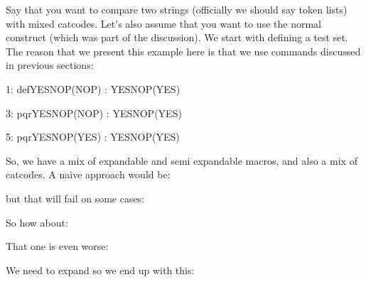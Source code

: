 {Say that you want to compare two strings (officially we should say token lists)
with mixed catcodes. Let's also assume that you want to use the normal \type
{\if} construct (which was part of the discussion). We start with defining
a test set. The reason that we present this example here is that we use
commands discussed in previous sections:

\startbuffer[run]
\semiprotected {}
              \edef\pqr{\expandtoken\notcatcodes`p%
                        \expandtoken\notcatcodes`q%
                        \expandtoken\notcatcodes`r}

1: \ifcondition{} {def}YES\else NOP\fi (NOP) : \ifcondition{}YES\else NOP\fi (YES)

3: \ifcondition{} {pqr}YES\else NOP\fi (NOP) : \ifcondition{}YES\else NOP\fi (YES)

5: \ifcondition{} {pqr}YES\else NOP\fi (YES) : \ifcondition\similartokens{pqr}{\pqr}YES\else NOP\fi (YES)
\stopbuffer

\typebuffer[run][option=TEX]

So, we have a mix of expandable and semi expandable macros, and also a mix of
catcodes. A naive approach would be:

\startbuffer[def]
\permanent\protected{}
\stopbuffer

\typebuffer[def][option=TEX]

but that will fail on some cases:

\pushoverloadmode \startpacked \tttf {}\stoppacked \popoverloadmode

So how about:

\startbuffer[def]
\permanent\protected{}
\stopbuffer

\typebuffer[def][option=TEX]

That one is even worse:

\pushoverloadmode \startpacked \tttf {}\stoppacked \popoverloadmode

We need to expand so we end up with this:

\startbuffer[def]
\permanent\protected{}
\stopbuffer

\typebuffer[def][option=TEX]

}
